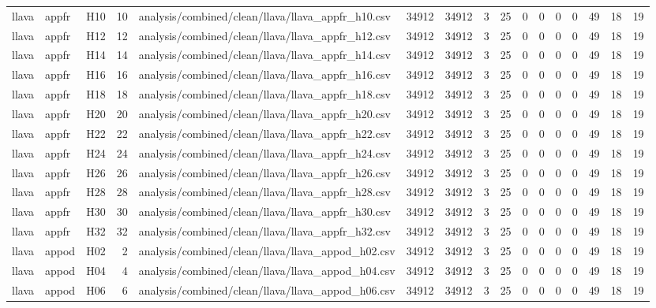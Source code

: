 \begin{longtable}{lllrlrrrrrrrrrrr}
llava & appfr & H10 & 10 & analysis/combined/clean/llava/llava\_appfr\_h10.csv & 34912 & 34912 & 3 & 25 & 0 & 0 & 0 & 0 & 49 & 18 & 19 \\
llava & appfr & H12 & 12 & analysis/combined/clean/llava/llava\_appfr\_h12.csv & 34912 & 34912 & 3 & 25 & 0 & 0 & 0 & 0 & 49 & 18 & 19 \\
llava & appfr & H14 & 14 & analysis/combined/clean/llava/llava\_appfr\_h14.csv & 34912 & 34912 & 3 & 25 & 0 & 0 & 0 & 0 & 49 & 18 & 19 \\
llava & appfr & H16 & 16 & analysis/combined/clean/llava/llava\_appfr\_h16.csv & 34912 & 34912 & 3 & 25 & 0 & 0 & 0 & 0 & 49 & 18 & 19 \\
llava & appfr & H18 & 18 & analysis/combined/clean/llava/llava\_appfr\_h18.csv & 34912 & 34912 & 3 & 25 & 0 & 0 & 0 & 0 & 49 & 18 & 19 \\
llava & appfr & H20 & 20 & analysis/combined/clean/llava/llava\_appfr\_h20.csv & 34912 & 34912 & 3 & 25 & 0 & 0 & 0 & 0 & 49 & 18 & 19 \\
llava & appfr & H22 & 22 & analysis/combined/clean/llava/llava\_appfr\_h22.csv & 34912 & 34912 & 3 & 25 & 0 & 0 & 0 & 0 & 49 & 18 & 19 \\
llava & appfr & H24 & 24 & analysis/combined/clean/llava/llava\_appfr\_h24.csv & 34912 & 34912 & 3 & 25 & 0 & 0 & 0 & 0 & 49 & 18 & 19 \\
llava & appfr & H26 & 26 & analysis/combined/clean/llava/llava\_appfr\_h26.csv & 34912 & 34912 & 3 & 25 & 0 & 0 & 0 & 0 & 49 & 18 & 19 \\
llava & appfr & H28 & 28 & analysis/combined/clean/llava/llava\_appfr\_h28.csv & 34912 & 34912 & 3 & 25 & 0 & 0 & 0 & 0 & 49 & 18 & 19 \\
llava & appfr & H30 & 30 & analysis/combined/clean/llava/llava\_appfr\_h30.csv & 34912 & 34912 & 3 & 25 & 0 & 0 & 0 & 0 & 49 & 18 & 19 \\
llava & appfr & H32 & 32 & analysis/combined/clean/llava/llava\_appfr\_h32.csv & 34912 & 34912 & 3 & 25 & 0 & 0 & 0 & 0 & 49 & 18 & 19 \\
llava & appod & H02 & 2 & analysis/combined/clean/llava/llava\_appod\_h02.csv & 34912 & 34912 & 3 & 25 & 0 & 0 & 0 & 0 & 49 & 18 & 19 \\
llava & appod & H04 & 4 & analysis/combined/clean/llava/llava\_appod\_h04.csv & 34912 & 34912 & 3 & 25 & 0 & 0 & 0 & 0 & 49 & 18 & 19 \\
llava & appod & H06 & 6 & analysis/combined/clean/llava/llava\_appod\_h06.csv & 34912 & 34912 & 3 & 25 & 0 & 0 & 0 & 0 & 49 & 18 & 19 \\

\end{longtable}
